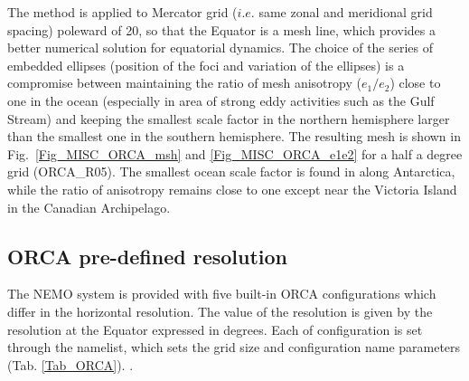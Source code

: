\documentclass[NEMO_book]{subfiles}
\begin{document}
The method is applied to Mercator grid ($i.e.$ same zonal and meridional grid spacing) poleward 
of 20\degN, so that the Equator is a mesh line, which provides a better numerical solution 
for equatorial dynamics. The choice of the series of embedded ellipses (position of the foci and 
variation of the ellipses) is a compromise between maintaining  the ratio of mesh anisotropy 
($e_1 / e_2$) close to one in the ocean (especially in area of strong eddy activities such as 
the Gulf Stream) and keeping the smallest scale factor in the northern hemisphere larger 
than the smallest one in the southern hemisphere.
The resulting mesh is shown in Fig.~\ref{Fig_MISC_ORCA_msh} and \ref{Fig_MISC_ORCA_e1e2} 
for a half a degree grid (ORCA\_R05). The smallest ocean scale factor is found in along  
Antarctica, while the ratio of anisotropy remains close to one except near the Victoria Island 
in the Canadian Archipelago. 

\subsection{ORCA pre-defined resolution}
\label{CFG_orca_resolution}


The NEMO system is provided with five built-in ORCA configurations which differ in the 
horizontal resolution. The value of the resolution is given by the resolution at the Equator 
expressed in degrees. Each of configuration is set through the \textit{} namelist, 
which sets the grid size and configuration 
name parameters  (Tab. \ref{Tab_ORCA}).
.
\end{document}
